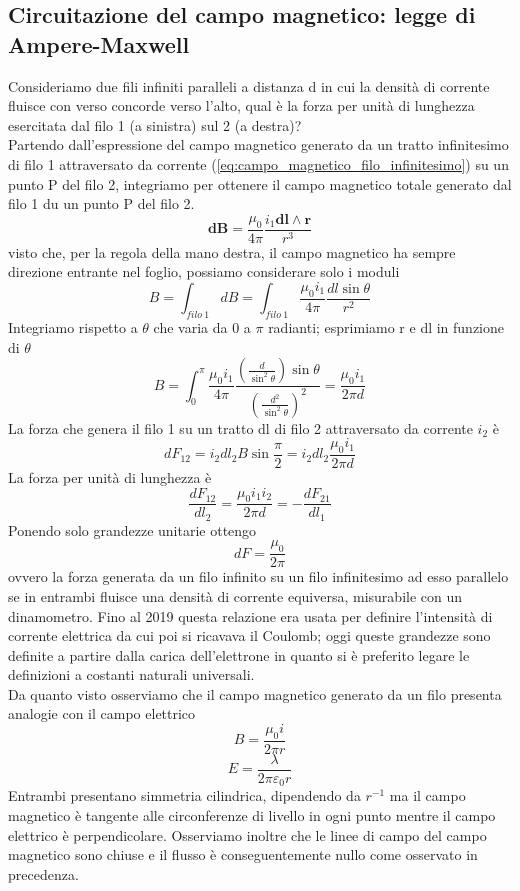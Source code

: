 \documentclass[
10pt, %
a4paper, %
oneside, %
headinclude,footinclude, %
BCOR5mm, %
]{scrartcl}
\begin{document}
\subsection{Circuitazione del campo magnetico: legge di Ampere-Maxwell}
Consideriamo due fili infiniti paralleli a distanza d in cui la densità di corrente fluisce con verso concorde verso l'alto, qual è la forza per unità di lunghezza esercitata dal filo 1 (a sinistra) sul 2 (a destra)? \\
Partendo dall'espressione del campo magnetico generato da un tratto infinitesimo di filo 1 attraversato da corrente (\ref{eq:campo_magnetico_filo_infinitesimo}) su un punto P del filo 2, integriamo per ottenere il campo magnetico totale generato dal filo 1 du un punto P del filo 2. 
\[\mathbf{dB} = \frac{\mu_0}{4\pi}\frac{i_1\mathbf{dl}\wedge\mathbf{r}}{r^3} \]
visto che, per la regola della mano destra, il campo magnetico ha sempre direzione entrante nel foglio, possiamo considerare solo i moduli
\[B=\int_{filo\ 1}dB= \int_{filo\ 1}\frac{\mu_0 i_1 }{4\pi}\frac{dl \sin\theta}{r^2}\]
Integriamo rispetto a $\theta$ che varia da 0 a $\pi$ radianti; esprimiamo r e dl in funzione di $\theta$
\[B = \int_{0}^{\pi}\frac{\mu_0 i_1 }{4\pi}\frac{\left(\frac{d}{\sin^2\theta}\right) \sin\theta}{\left(\frac{d^2}{\sin^2\theta}\right)^2}= \frac{\mu_0 i_1}{2\pi d}\]
La forza che genera il filo 1 su un tratto dl di filo 2 attraversato da corrente \(i_2\) è 
\[dF_{12} = i_2dl_2 B\sin\frac{\pi}{2}=i_2dl_2 \frac{\mu_0 i_1}{2\pi d}\]
La forza per unità di lunghezza è 
\[\frac{dF_{12}}{dl_2}= \frac{\mu_0 i_1i_2}{2\pi d}=-\frac{dF_{21}}{dl_1}\]
Ponendo solo grandezze unitarie ottengo
\[dF = \frac{\mu_0}{2\pi}\]
ovvero la forza generata da un filo infinito su un filo infinitesimo ad esso parallelo se in entrambi fluisce una densità di corrente equiversa, misurabile con un dinamometro. Fino al 2019 questa relazione era usata per definire l'intensità di corrente elettrica da cui poi si ricavava il Coulomb; oggi queste grandezze sono definite a partire dalla carica dell'elettrone in quanto si è preferito legare le definizioni a costanti naturali universali.\\
Da quanto visto osserviamo che il campo magnetico generato da un filo presenta analogie con il campo elettrico
\[B = \frac{\mu_0 i}{2\pi r}\]
\[E = \frac{\lambda}{2\pi \varepsilon_0 r}\]
Entrambi presentano simmetria cilindrica, dipendendo da \(r^{-1}\) ma il campo magnetico è tangente alle circonferenze di livello in ogni punto mentre il campo elettrico è perpendicolare. Osserviamo inoltre che le linee di campo del campo magnetico sono chiuse e il flusso è conseguentemente nullo come osservato in precedenza. 
\end{document}
